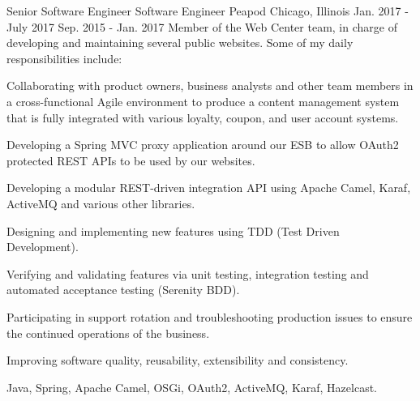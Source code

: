 \begin{cventries}
  \experienceentryextra
    {Senior Software Engineer} %
    {Software Engineer} %
    {Peapod} %
    {Chicago, Illinois} %
    {Jan. 2017 - July 2017} %
    {Sep. 2015 - Jan. 2017} %
    {Member of the Web Center team, in charge of developing and maintaining several public websites. Some of my daily responsibilities include:
    } %
    {
    	\begin{cvitems}
  		\item Collaborating with product owners, business analysts and other team members in a cross-functional Agile environment to produce a content management system that is fully integrated with various loyalty, coupon, and user account systems.
  		\item Developing a Spring MVC proxy application around our ESB to allow OAuth2 protected REST APIs to be used by our websites.
  		\item Developing a modular REST-driven integration API using Apache Camel, Karaf, ActiveMQ and various other libraries.
  		\item Designing and implementing new features using TDD (Test Driven Development).
  		\item Verifying and validating features via unit testing, integration testing and automated acceptance testing (Serenity BDD).
  		\item Participating in support rotation and troubleshooting production issues to ensure the continued operations of the business.
  		\item Improving software quality, reusability, extensibility and consistency.
	\end{cvitems} 
    }
    {Java, Spring, Apache Camel, OSGi, OAuth2, ActiveMQ, Karaf, Hazelcast.}
    
  

\end{cventries}
